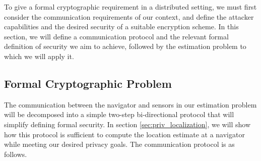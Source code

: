 \documentclass[10pt,letterpaper,oneside,twocolumn,journal]{IEEEtran}
\theoremstyle{definition}
\theoremstyle{definition}
\theoremstyle{remark}
\begin{document}
To give a formal cryptographic requirement in a distributed setting, we must first consider the communication requirements of our context, and define the attacker capabilities and the desired security of a suitable encryption scheme. In this section, we will define a communication protocol and the relevant formal definition of security we aim to achieve, followed by the estimation problem to which we will apply it.

% 
% 

\subsection{Formal Cryptographic Problem} \label{subsec:crypto_problem}
The communication between the navigator and sensors in our estimation problem will be decomposed into a simple two-step bi-directional protocol that will simplify defining formal security. In section \ref{sec:priv_localization}, we will show how this protocol is sufficient to compute the location estimate at a navigator while meeting our desired privacy goals. The communication protocol is as follows.
\end{document}
